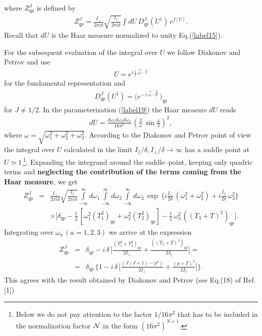 \documentclass[a4paper,11pt]{article}
\begin{document}
%
where $Z^J_{qp}$ is defined by
%
\begin{eqnarray}\label{label18}
Z^J_{qp} = \frac{I_{\perp}}{2\pi i
\delta}\sqrt{\frac{I_{\parallel}}{2\pi i \delta}}\int
dU\,D^J_{qp}(U^{\dagger})\,e^{\textstyle f[U]}.
\end{eqnarray}
%
Recall that $dU$ is the Haar measure normalized to unity
Eq.(\ref{label15}).

For the subsequent evaluation of the integral over $U$ we follow
Diakonov and Petrov and use
%
\begin{eqnarray}\label{label19}
U = e^{\textstyle i\,\frac{1}{2}\,\vec{\omega}\cdot \vec{\tau}}
\end{eqnarray}
%
for the fundamental representation and
%
\begin{eqnarray}\label{label20}
D^J_{qp}(U^{\dagger}) = \Big(e^{\textstyle -\,i\,\vec{\omega}\cdot
\vec{T}}\,\Big)_{qp}
\end{eqnarray}
%
for $J\not= 1/2$. In the parameterization (\ref{label19}) the Haar
measure $dU$ reads
%
\begin{eqnarray}\label{label21}
dU =
\frac{d\omega_1d\omega_2d\omega_3}{16\pi^2}\,\left(\frac{2}{\omega}\,
\sin\frac{\omega}{2}\right)^2,
\end{eqnarray}
%
where $\omega = \sqrt{\omega^2_1 + \omega^2_2 + \omega^2_3}$.
According to the Diakonov and Petrov point of view the integral over
$U$ calculated in the limit $I_{\parallel}/\delta, I_{\perp}/\delta
\to \infty$ has a saddle point at $U\simeq 1$\,\footnote{Below we do
not pay attention to the factor $1/16\pi^2$ that has to be included in
the normalization factor ${\cal N}$ in the form
$(16\pi^2)^{N+1}$.}. Expanding the integrand around the saddle--point,
keeping only quadric terms and {\bf neglecting the contribution of the
terms coming from the Haar measure}, we get
%
\begin{eqnarray}\label{label22}
Z^J_{qp} &=& \frac{I_{\perp}}{2\pi i
\delta}\sqrt{\frac{I_{\parallel}}{2\pi i
\delta}}\int\limits^{\infty}_{-\infty}d\omega_1
\int\limits^{\infty}_{-\infty}d\omega_2\int\limits^{\infty}_{-\infty}
d\omega_3\,\exp\, \Bigg\{i\frac{I_{\perp}}{2\delta}\,(\omega^2_1 +
\omega^2_2) +
i\frac{I_{\parallel}}{2\delta}\,\omega^2_3\Bigg\}\nonumber\\ &&\times
\Bigg[\delta_{qp} - \frac{1}{2}\,[\omega^2_1(T^2_1)_{qp} +
\omega^2_2(T^2_2)_{qp}] - \frac{1}{2}\,\omega^2_3\,((T_3+ 
T)^2)_{qp}\Bigg].
\end{eqnarray}
%
Integrating over $\omega_a\,(a=1,2,3)$ we arrive at the expression
%
\begin{eqnarray}\label{label23}
Z^J_{qp} &=& \delta_{qp} - i\,\delta\,\Bigg[\frac{(T^2_1 + T^2_2)_{qp}}{2I_{\perp}}
+ \frac{((T_3 + T)^2)_{qp}}{2I_{\parallel}}\Bigg]=\nonumber\\
&=&\delta_{qp}\,\Bigg\{1 -i\,\delta\,\Bigg[\frac{(J(J+1) - p^2)}{2I_{\perp}}
+ \frac{(p + T)^2}{2I_{\parallel}}\Bigg]\Bigg\}.
\end{eqnarray}
%
This agrees with the result obtained by Diakonov and Petrov (see
Eq.(18) of Ref.[1])
\end{document}
